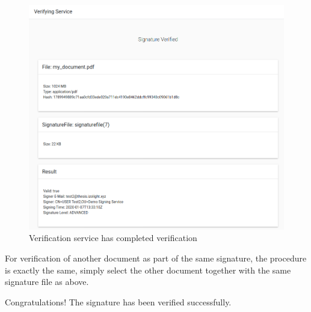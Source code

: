 \begin{figure}[H]
    \begin{center}
        \includegraphics[width=\linewidth]{images/userguide_verify_2.png}
    \end{center}
    \caption{Verification service has completed verification}
    \label{fig:verify2}
\end{figure}

For verification of another document as part of the same signature,
the procedure is exactly the same,
simply select the other document together with the same signature file as above.

Congratulations!
The signature has been verified successfully.
